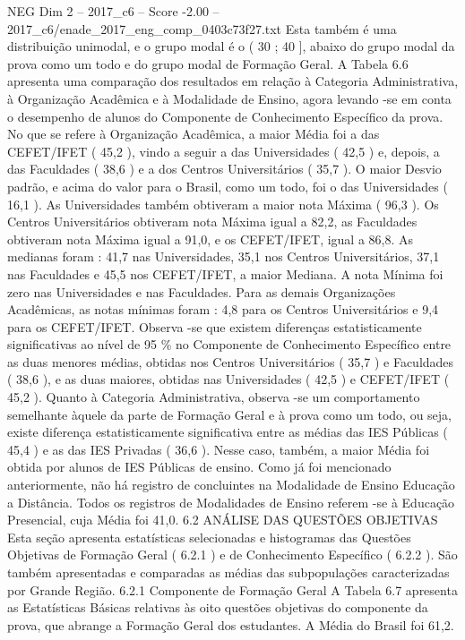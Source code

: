 \begin{textsample}{NEG Dim 2 – 2017\_c6 – Score -2.00 – 2017\_c6/enade\_2017\_eng\_comp\_0403c73f27.txt}
Esta também é uma distribuição unimodal, e o grupo modal é o ( 30 ; 40 ], abaixo do grupo modal da prova como um todo e do grupo modal de Formação Geral.
A Tabela 6.6 apresenta uma comparação dos resultados em relação à Categoria Administrativa, à Organização Acadêmica e à Modalidade de Ensino, agora levando -se em conta o desempenho de alunos do Componente de Conhecimento Específico da prova.
No que se refere à Organização Acadêmica, a maior Média foi a das CEFET/IFET ( 45,2 ), vindo a seguir a das Universidades ( 42,5 ) e, depois, a das Faculdades ( 38,6 ) e a dos Centros Universitários ( 35,7 ).
O maior Desvio padrão, e acima do valor para o Brasil, como um todo, foi o das Universidades ( 16,1 ).
As Universidades também obtiveram a maior nota Máxima ( 96,3 ).
Os Centros Universitários obtiveram nota Máxima igual a 82,2, as Faculdades obtiveram nota Máxima igual a 91,0, e os CEFET/IFET, igual a 86,8.
As medianas foram : 41,7 nas Universidades, 35,1 nos Centros Universitários, 37,1 nas Faculdades e 45,5 nos CEFET/IFET, a maior Mediana.
A nota Mínima foi zero nas Universidades e nas Faculdades.
Para as demais Organizações Acadêmicas, as notas mínimas foram : 4,8 para os Centros Universitários e 9,4 para os CEFET/IFET.
Observa -se que existem diferenças estatisticamente significativas ao nível de 95 \% no Componente de Conhecimento Específico entre as duas menores médias, obtidas nos Centros Universitários ( 35,7 ) e Faculdades ( 38,6 ), e as duas maiores, obtidas nas Universidades ( 42,5 ) e CEFET/IFET ( 45,2 ).
Quanto à Categoria Administrativa, observa -se um comportamento semelhante àquele da parte de Formação Geral e à prova como um todo, ou seja, existe diferença estatisticamente significativa entre as médias das IES Públicas ( 45,4 ) e as das IES Privadas ( 36,6 ).
Nesse caso, também, a maior Média foi obtida por alunos de IES Públicas de ensino.
Como já foi mencionado anteriormente, não há registro de concluintes na Modalidade de Ensino Educação a Distância.
Todos os registros de Modalidades de Ensino referem -se à Educação Presencial, cuja Média foi 41,0. 6.2 ANÁLISE DAS QUESTÕES OBJETIVAS Esta seção apresenta estatísticas selecionadas e histogramas das Questões Objetivas de Formação Geral ( 6.2.1 ) e de Conhecimento Específico ( 6.2.2 ).
São também apresentadas e comparadas as médias das subpopulações caracterizadas por Grande Região. 6.2.1 Componente de Formação Geral A Tabela 6.7 apresenta as Estatísticas Básicas relativas às oito questões objetivas do componente da prova, que abrange a Formação Geral dos estudantes.
A Média do Brasil foi 61,2.

\end{textsample}
